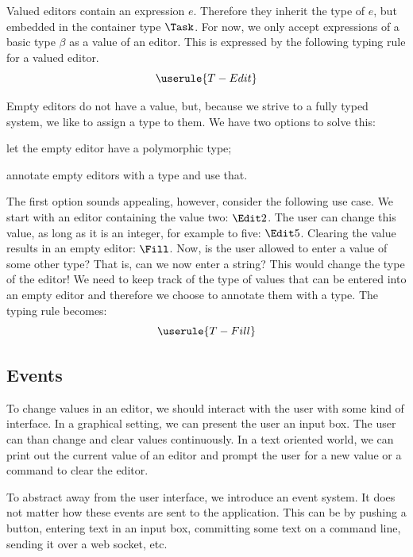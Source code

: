 Valued editors contain an expression $e$.
Therefore they inherit the type of $e$,
but embedded in the container type $\Task$.
For now, we only accept expressions of a basic type $\beta$ as a value of an editor.
This is expressed by the following typing rule for a valued editor.
\begin{equation*}
  \userule{T-Edit}
\end{equation*}

Empty editors do not have a value,
but, because we strive to a fully typed system,
we like to assign a type to them.
We have two options to solve this:
\begin{enumerate*}
  \item let the empty editor have a polymorphic type;
  \item annotate empty editors with a type and use that.
\end{enumerate*}
The first option sounds appealing, however, consider the following use case.
We start with an editor containing the value two: $\Edit 2$.
The user can change this value, as long as it is an integer,
for example to five: $\Edit 5$.
Clearing the value results in an empty editor: $\Fill$.
Now, is the user allowed to enter a value of some other type?
That is, can we now enter a string?
This would change the type of the editor!
We need to keep track of the type of values that can be entered into an empty editor
and therefore we choose to annotate them with a type.
The typing rule becomes:
\begin{equation*}
  \userule{T-Fill}
\end{equation*}


\subsection{Events}

To change values in an editor,
we should interact with the user with some kind of interface.
In a graphical setting,
we can present the user an input box.
The user can than change and clear values continuously.
In a text oriented world,
we can print out the current value of an editor
and prompt the user for a new value
or a command to clear the editor.

To abstract away from the user interface,
we introduce an event system.
It does not matter how these events are sent to the application.
This can be by pushing a button,
entering text in an input box,
committing some text on a command line,
sending it over a web socket,
etc.

